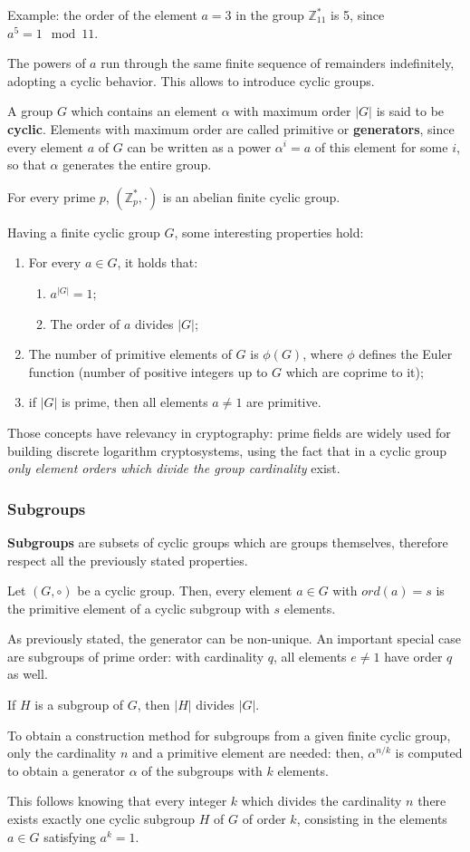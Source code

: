 Example: the order of the element $a = 3$ in the group $\mathbb{Z}^*_{11}$ is 5, since $a^5 = 1 \mod 11$. 

The powers of $a$ run through the same finite sequence of remainders indefinitely, adopting a cyclic behavior. This allows to introduce cyclic groups.

A group $G$ which contains an element $\alpha$ with maximum order $|G|$ is said to be \textbf{cyclic}. Elements with maximum order are called primitive or \textbf{generators}, since every element $a$ of $G$ can be written as a power $\alpha^i = a$ of this element for some $i$, so that $\alpha$ generates the entire group.

For every prime $p$, $(\mathbb{Z}^*_p, \cdot)$ is an abelian finite cyclic group.

Having a finite cyclic group $G$, some interesting properties hold:
\begin{enumerate}
	\item For every $a \in G$, it holds that:
	\begin{enumerate}
		\item $a^{|G|} = 1$;
		\item The order of $a$ divides $|G|$;
	\end{enumerate}
	\item The number of primitive elements of $G$ is $\phi(G)$, where $\phi$ defines the Euler function (number of positive integers up to $G$ which are coprime to it);
	\item if $|G|$ is prime, then all elements $a \neq 1$ are primitive.
\end{enumerate}
Those concepts have relevancy in cryptography: prime fields are widely used for building discrete logarithm cryptosystems, using the fact that in a cyclic group \textit{only element orders which divide the group cardinality} exist. 

\subsubsection{Subgroups}
\textbf{Subgroups} are subsets of cyclic groups which are groups themselves, therefore respect all the previously stated properties. 

Let $(G, \circ)$ be a cyclic group. Then, every element $a \in G$ with $ord(a) = s$ is the primitive element of a cyclic subgroup with $s$ elements.

As previously stated, the generator can be non-unique. An important special case are subgroups of prime order: with cardinality $q$, all elements $e \neq 1$ have order $q$ as well.

If $H$ is a subgroup of $G$, then $|H|$ divides $|G|$. 

To obtain a construction method for subgroups from a given finite cyclic group, only the cardinality $n$ and a primitive element are needed: then, $\alpha^{n/k}$ is computed to obtain a generator $\alpha$ of the subgroups with $k$ elements.

This follows knowing that every integer $k$ which divides the cardinality $n$ there exists exactly one cyclic subgroup $H$ of $G$ of order $k$, consisting in the elements $a \in G$ satisfying $a^k = 1$. 


